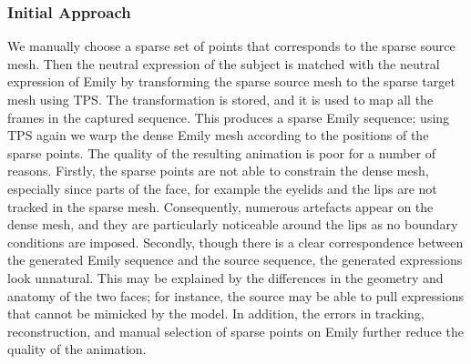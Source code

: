 \subsubsection{Initial Approach}
We manually choose a sparse set of points that corresponds to the sparse source mesh. Then the neutral expression of the subject is matched with the neutral expression of Emily by transforming the sparse source mesh to the sparse target mesh using TPS. The transformation is stored, and it is used to map all the frames in the captured sequence. This produces a sparse Emily sequence; using TPS again we warp the dense Emily mesh according to the positions of the sparse points. The quality of the resulting animation is poor for a number of reasons. Firstly, the sparse points are not able to constrain the dense mesh, especially since parts of the face, for example the eyelids and the lips are not tracked in the sparse mesh. Consequently, numerous artefacts appear on the dense mesh, and they are particularly noticeable around the lips as no boundary conditions are imposed. Secondly, though there is a clear correspondence between the generated Emily sequence and the source sequence, the generated expressions look unnatural. This may be explained by the differences in the geometry and anatomy of the two faces; for instance, the source may be able to pull expressions that cannot be mimicked by the model. In addition, the errors in tracking, reconstruction, and manual selection of sparse points on Emily further reduce the quality of the animation.

